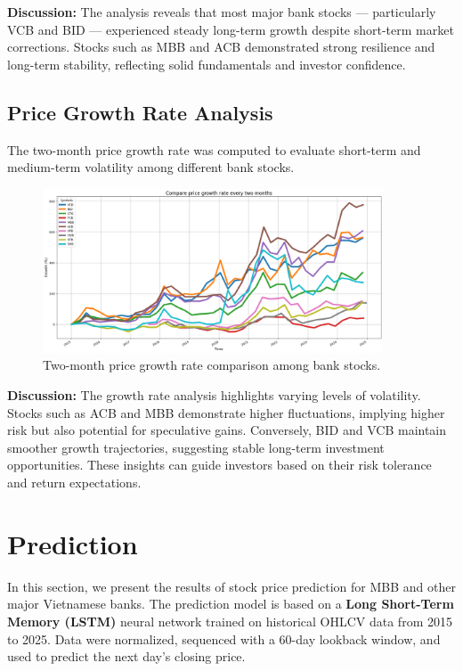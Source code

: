 \documentclass[12pt,a4paper]{article}
\begin{document}
\textbf{Discussion:}  
The analysis reveals that most major bank stocks — particularly VCB and BID — experienced steady long-term growth despite short-term market corrections.  
Stocks such as MBB and ACB demonstrated strong resilience and long-term stability, reflecting solid fundamentals and investor confidence.

\subsection{Price Growth Rate Analysis}
The two-month price growth rate was computed to evaluate short-term and medium-term volatility among different bank stocks.

\begin{figure}[H]
    \centering
    \includegraphics[width=0.9\textwidth]{price_growth_rate.png}
    \caption{Two-month price growth rate comparison among bank stocks.}
    \label{fig:growth}
\end{figure}

\textbf{Discussion:}  
The growth rate analysis highlights varying levels of volatility.  
Stocks such as ACB and MBB demonstrate higher fluctuations, implying higher risk but also potential for speculative gains.  
Conversely, BID and VCB maintain smoother growth trajectories, suggesting stable long-term investment opportunities.  
These insights can guide investors based on their risk tolerance and return expectations.

\section{Prediction}

In this section, we present the results of stock price prediction for MBB and other major Vietnamese banks.  
The prediction model is based on a \textbf{Long Short-Term Memory (LSTM)} neural network trained on historical OHLCV data from 2015 to 2025.  
Data were normalized, sequenced with a 60-day lookback window, and used to predict the next day's closing price.
\end{document}
